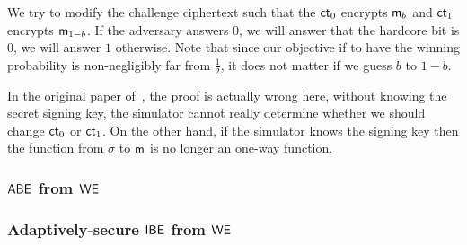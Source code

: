  We try to modify the challenge ciphertext such that the $\mathsf{ct}_0$ encrypts $\mathsf{m}_b$ and $\mathsf{ct}_1$ encrypts $\mathsf{m}_{1-b}$. If the adversary answers $0$, we will answer that the hardcore bit is $0$, we will answer $1$ otherwise. Note that since our objective if to have the winning probability is non-negligibly far from $\frac{1}{2}$, it does not matter if we guess $b$ to $1-b$.

{\color{red} In the original paper of~\cite{STOC:GGSW13}, the proof is actually wrong here, without knowing the secret signing key, the simulator cannot really determine whether we should change $\mathsf{ct}_0$ or $\mathsf{ct}_1$. On the other hand, if the simulator knows the signing key then the function from $\sigma$ to $\mathsf{m}$ is no longer an one-way function.}

\subsubsection{$\mathsf{ABE}$ from $\mathsf{WE}$}

\subsubsection{Adaptively-secure $\mathsf{IBE}$ from $\mathsf{WE}$}
